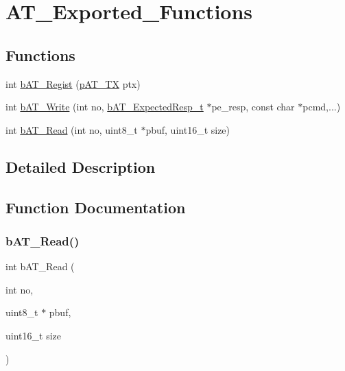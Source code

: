\hypertarget{group___a_t___exported___functions}{}\section{A\+T\+\_\+\+Exported\+\_\+\+Functions}
\label{group___a_t___exported___functions}
\subsection*{Functions}
\begin{DoxyCompactItemize}
\item 
int \mbox{\hyperlink{group___a_t___exported___functions_gafab0d30ccf93e9d332ab8c54389b2e97}{b\+A\+T\+\_\+\+Regist}} (\mbox{\hyperlink{group___a_t___exported___types_definitions_ga160ea044085772742d8b369ae5af1f8e}{p\+A\+T\+\_\+\+TX}} ptx)
\item 
int \mbox{\hyperlink{group___a_t___exported___functions_ga70c7211e4de1db5c3f4c7e8707e4979d}{b\+A\+T\+\_\+\+Write}} (int no, \mbox{\hyperlink{structb_a_t___expected_resp__t}{b\+A\+T\+\_\+\+Expected\+Resp\+\_\+t}} $\ast$pe\+\_\+resp, const char $\ast$pcmd,...)
\item 
int \mbox{\hyperlink{group___a_t___exported___functions_ga8c06cbe99efea24cb2510ac555967fbf}{b\+A\+T\+\_\+\+Read}} (int no, uint8\+\_\+t $\ast$pbuf, uint16\+\_\+t size)
\end{DoxyCompactItemize}


\subsection{Detailed Description}


\subsection{Function Documentation}
\mbox{\label{group___a_t___exported___functions_ga8c06cbe99efea24cb2510ac555967fbf}} 
\subsubsection{\texorpdfstring{b\+A\+T\+\_\+\+Read()}{bAT\_Read()}}
{\footnotesize\ttfamily int b\+A\+T\+\_\+\+Read (\begin{DoxyParamCaption}\item[{int}]{no,  }\item[{uint8\+\_\+t $\ast$}]{pbuf,  }\item[{uint16\+\_\+t}]{size }\end{DoxyParamCaption})}



